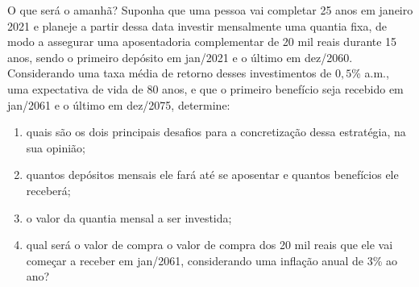 
\begin{task}{O que será o amanhã?}
Suponha que uma pessoa vai completar 25 anos em janeiro 2021 e planeje a partir dessa data investir mensalmente uma quantia fixa, de modo a assegurar uma aposentadoria complementar de 20 mil reais durante 15 anos, sendo o primeiro depósito em jan/2021 e o último em dez/2060. Considerando uma taxa média de retorno desses investimentos de $0{,}5$\% a.m., uma expectativa de vida de 80 anos, e que o primeiro benefício seja recebido em jan/2061 e o último em dez/2075, determine:
\begin{enumerate}
  \item quais são os dois principais desafios para a concretização dessa estratégia, na sua opinião;
  \item quantos depósitos mensais ele fará até se aposentar e quantos benefícios ele receberá;
  \item o valor da quantia mensal a ser investida;
  \item qual será o valor de compra o valor de compra dos 20 mil reais que ele vai começar a receber em jan/2061, considerando uma inflação anual de $3$\% ao ano?
\end{enumerate}
\end{task}

